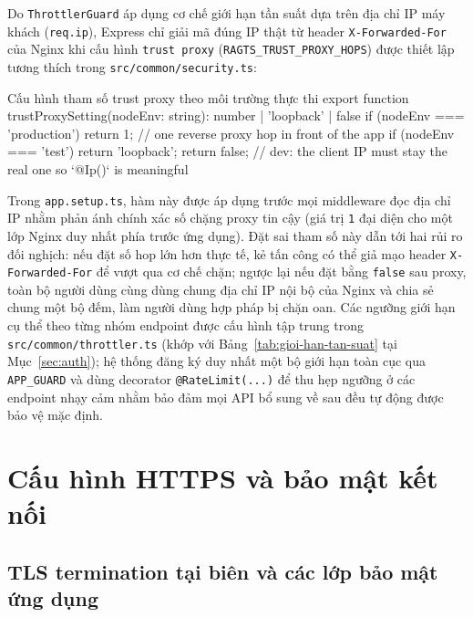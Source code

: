 Do \texttt{ThrottlerGuard} áp dụng cơ chế giới hạn tần suất dựa trên địa chỉ IP máy khách (\texttt{req.\allowbreak{}ip}), Express chỉ giải mã đúng IP thật từ header \texttt{X-\allowbreak{}Forwarded-\allowbreak{}For} của Nginx khi cấu hình \texttt{trust proxy} (\texttt{RAGTS\_\allowbreak{}TRUST\_\allowbreak{}PROXY\_\allowbreak{}HOPS}) được thiết lập tương thích trong \texttt{src/\allowbreak{}common/\allowbreak{}security.\allowbreak{}ts}:

\begin{tsbox}{Cấu hình tham số trust proxy theo môi trường thực thi}
export function trustProxySetting(nodeEnv: string): number | 'loopback' | false {
  if (nodeEnv === 'production') return 1; // one reverse proxy hop in front of the app
  if (nodeEnv === 'test') return 'loopback';
  return false; // dev: the client IP must stay the real one so `@Ip()` is meaningful
}
\end{tsbox}

Trong \texttt{app.\allowbreak{}setup.\allowbreak{}ts}, hàm này được áp dụng trước mọi middleware đọc địa chỉ IP nhằm phản ánh chính xác số chặng proxy tin cậy (giá trị \texttt{1} đại diện cho một lớp Nginx duy nhất phía trước ứng dụng). Đặt sai tham số này dẫn tới hai rủi ro đối nghịch: nếu đặt số hop lớn hơn thực tế, kẻ tấn công có thể giả mạo header \texttt{X-\allowbreak{}Forwarded-\allowbreak{}For} để vượt qua cơ chế chặn; ngược lại nếu đặt bằng \texttt{false} sau proxy, toàn bộ người dùng cùng dùng chung địa chỉ IP nội bộ của Nginx và chia sẻ chung một bộ đếm, làm người dùng hợp pháp bị chặn oan. Các ngưỡng giới hạn cụ thể theo từng nhóm endpoint được cấu hình tập trung trong \texttt{src/\allowbreak{}common/\allowbreak{}throttler.\allowbreak{}ts} (khớp với Bảng~\ref{tab:gioi-han-tan-suat} tại Mục~\ref{sec:auth}); hệ thống đăng ký duy nhất một bộ giới hạn toàn cục qua \texttt{APP\_\allowbreak{}GUARD} và dùng decorator \texttt{@\allowbreak{}RateLimit(.\allowbreak{}.\allowbreak{}.\allowbreak{})} để thu hẹp ngưỡng ở các endpoint nhạy cảm nhằm bảo đảm mọi API bổ sung về sau đều tự động được bảo vệ mặc định.

\section{Cấu hình HTTPS và bảo mật kết nối}
\label{sec:cau-hinh-https}

\subsection{TLS termination tại biên và các lớp bảo mật ứng dụng}
\label{subsec:tls-va-bao-mat}

